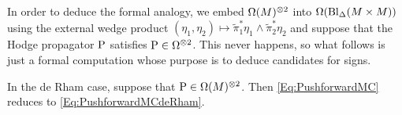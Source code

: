 \documentclass[\MainFolder/Text.tex]{subfiles}
\begin{document}
In order to deduce the formal analogy, we embed $\Omega(M)^{\otimes 2}$ into $\Omega(\mathrm{Bl}_{\Delta}(M\times M))$ using the external wedge product $(\eta_1,\eta_2)\mapsto \tilde{\pi}_1^*\eta_1 \wedge \tilde{\pi}_2^*\eta_2$ and suppose that the Hodge propagator $\mathrm{P}$ satisfies $\mathrm{P} \in \Omega^{\otimes 2}$. This never happens, so what follows is just a formal computation whose purpose is to deduce candidates for signs.%

\begin{Proposition}\label{Prop:FinDimAnalog}
In the de Rham case, suppose that $\mathrm{P}\in \Omega(M)^{\otimes 2}$. Then \eqref{Eq:PushforwardMC} reduces to \eqref{Eq:PushforwardMCdeRham}.
\end{Proposition}
\end{document}
